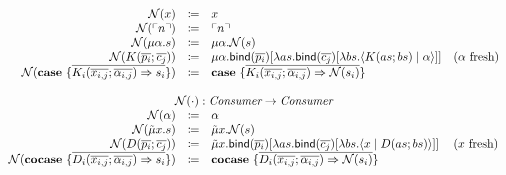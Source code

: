 \[\begin{array}{rcll}
    \name{x} & \coloneq & x & \\
    \name{\lit{n}} & \coloneq & \lit{n} & \\
    \name{\mu\alpha.s} & \coloneq & \mu\alpha.\name{s} & \\
    \name{K(\overline{p_i}; \overline{c_j})} & \coloneq & \mu\alpha.\bind{\overline{p_i}}{\lambda as.\bind{\overline{c_j}}{\lambda bs.\cut{K(as; bs)}{\alpha}}} & \fresh{\alpha} \\
    \name{\case{\overline{K_i(\overline{x_{i,j}}; \overline{\alpha_{i,j}}) \Rightarrow s_i}}} & \coloneq & \case{\overline{K_i(\overline{x_{i,j}}; \overline{\alpha_{i,j}}) \Rightarrow \name{s_i}}} & \\
    \\
    \multicolumn{4}{c}{\name{\cdot} : \emph{Consumer} \rightarrow \emph{Consumer}}\\
    \name{\alpha} & \coloneq & \alpha & \\
    \name{\tilde{\mu}x.s} & \coloneq & \tilde{\mu}x.\name{s} & \\
    \name{D(\overline{p_i}; \overline{c_j})} & \coloneq & \tilde{\mu}x.\bind{\overline{p_i}}{\lambda as.\bind{\overline{c_j}}{\lambda bs.\cut{x}{D(as; bs)}}} & \fresh{x} \\
    \name{\cocase{\overline{D_i(\overline{x_{i,j}}; \overline{\alpha_{i,j}}) \Rightarrow s_i}}} & \coloneq & \cocase{\overline{D_i(\overline{x_{i,j}}; \overline{\alpha_{i,j}}) \Rightarrow \name{s_i}}} & \\
  \end{array}
\]

